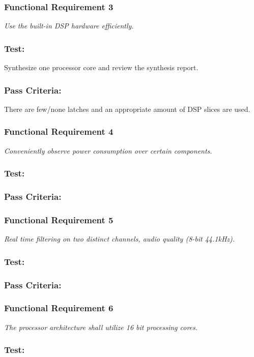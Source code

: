 \subsubsection*{Functional Requirement 3}
\textit{Use the built-in DSP hardware efficiently.}
\subsubsection*{Test:}
Synthesize one processor core and review the synthesis report. 
\subsubsection*{Pass Criteria:}
There are few/none latches and an appropriate amount of DSP slices are used.


\subsubsection*{Functional Requirement 4}
\textit{Conveniently observe power consumption over certain components.}
\subsubsection*{Test:}
\subsubsection*{Pass Criteria:}


\subsubsection*{Functional Requirement 5}
\textit{Real time filtering on two distinct channels, audio quality (8-bit 44.1kHz).}
\subsubsection*{Test:}
\subsubsection*{Pass Criteria:}

\subsubsection*{Functional Requirement 6}
\textit{The processor architecture shall utilize 16 bit processing cores.}
\subsubsection*{Test:}
